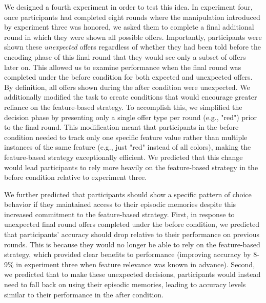 \documentclass[10pt,letterpaper]{article}
\begin{document}
We designed a fourth experiment in order to test this idea. In experiment four, once participants had completed eight rounds where the manipulation introduced by experiment three was honored, we asked them to complete a final additional round in which they were shown all possible offers. Importantly, participants were shown these \textit{unexpected} offers regardless of whether they had been told before the encoding phase of this final round that they would see only a subset of offers later on. This allowed us to examine performance when the final round was completed under the before condition for both expected and unexpected offers. By definition, all offers shown during the after condition were unexpected. We additionally modified the task to create conditions that would encourage greater reliance on the feature-based strategy. To accomplish this, we simplified the decision phase by presenting only a single offer type per round (e.g., "red") prior to the final round. This modification meant that participants in the before condition needed to track only one specific feature value rather than multiple instances of the same feature (e.g., just "red" instead of all colors), making the feature-based strategy exceptionally efficient. We predicted that this change would lead participants to rely more heavily on the feature-based strategy in the before condition relative to experiment three.

We further predicted that participants should show a specific pattern of choice behavior if they maintained access to their episodic memories despite this increased commitment to the feature-based strategy. First, in response to unexpected final round offers completed under the before condition, we predicted that participants' accuracy should drop relative to their performance on previous rounds. This is because they would no longer be able to rely on the feature-based strategy, which provided clear benefits to performance (improving accuracy by 8-9\% in experiment three when feature relevance was known in advance). Second, we predicted that to make these unexpected decisions, participants would instead need to fall back on using their episodic memories, leading to accuracy levels similar to their performance in the after condition.
\end{document}
